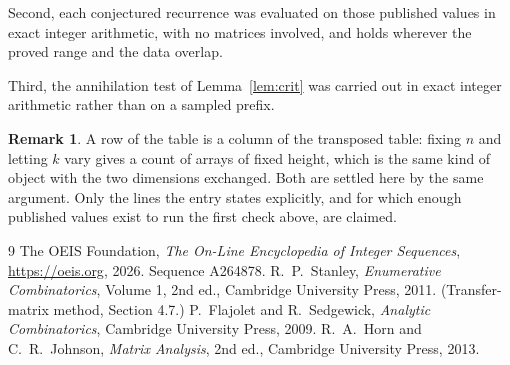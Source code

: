 \documentclass[11pt,a4paper]{article}
\theoremstyle{plain}
\theoremstyle{definition}
\newtheorem{remark}[theorem]{Remark}
\begin{document}
Second, each conjectured recurrence was evaluated on those published values in exact
integer arithmetic, with no matrices involved, and holds wherever the proved range and the
data overlap.

Third, the annihilation test of Lemma~\ref{lem:crit} was carried out in exact integer
arithmetic rather than on a sampled prefix.

\begin{remark}
A row of the table is a column of the transposed table: fixing $n$ and letting $k$ vary gives a
count of arrays of fixed height, which is the same kind of object with the two dimensions
exchanged. Both are settled here by the same argument. Only the lines the entry states
explicitly, and for which enough published values exist to run the first check above, are
claimed.
\end{remark}

\begin{thebibliography}{9}
 The OEIS Foundation, \emph{The On-Line Encyclopedia of Integer
Sequences}, \url{https://oeis.org}, 2026. Sequence A264878.
 R.~P.~Stanley, \emph{Enumerative Combinatorics}, Volume 1, 2nd ed.,
Cambridge University Press, 2011. (Transfer-matrix method, Section 4.7.)
 P.~Flajolet and R.~Sedgewick, \emph{Analytic Combinatorics}, Cambridge
University Press, 2009.
 R.~A.~Horn and C.~R.~Johnson, \emph{Matrix Analysis}, 2nd ed., Cambridge
University Press, 2013.
\end{thebibliography}
\end{document}

